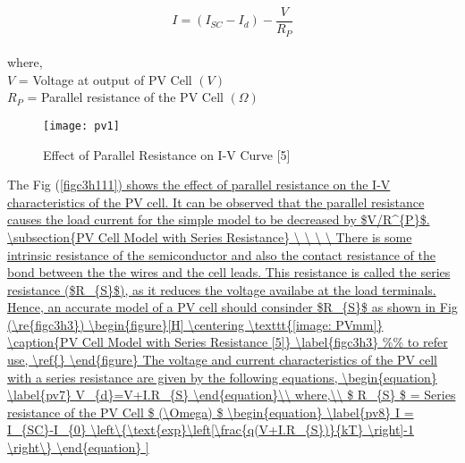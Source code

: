 \begin{equation}
\label{pv6}
I = (I_{SC}-I_{d})-\frac{V}{R_{P}}
\end{equation}\\
where,\\
$ V $ = Voltage at output of PV Cell $ (V) $ \\
$ R_{P} $ = Parallel resistance of the PV Cell $ (\Omega) $ 

\begin{figure}[H]
\centering
\texttt{[image: pv1]}
\caption{Effect of Parallel Resistance on I-V Curve [5]}
\label{figc3h111} %
\end{figure}

The Fig (\ref{figc3h111]) shows the effect of parallel resistance on the I-V characteristics of the PV cell. It can be observed that the parallel resistance causes the load current for the simple model to be decreased by $V/R^{P}$.

\subsection{PV Cell Model with Series Resistance}
\
\
\
\
There is some intrinsic resistance of the semiconductor and also the contact resistance of the bond between the the wires and the cell leads. This resistance is called the series resistance ($R_{S}$), as it reduces the voltage availabe at the load terminals.
Hence, an accurate model of a PV cell should consinder $R_{S}$ as shown in Fig (\re{figc3h3})

\begin{figure}[H]
\centering
\texttt{[image: PVmm]}
\caption{PV Cell Model with Series Resistance [5]}
\label{figc3h3} %
\end{figure}

The voltage and current characteristics of the PV cell with a series resistance are given by the following equations,

\begin{equation}
\label{pv7}
V_{d}=V+I.R_{S}
\end{equation}\\
where,\\
$ R_{S} $ = Series resistance of the PV Cell $ (\Omega) $ 

\begin{equation}
\label{pv8}
I = I_{SC}-I_{0} \left\{\text{exp}\left[\frac{q(V+I.R_{S})}{kT} \right]-1 \right\}
\end{equation}

}
